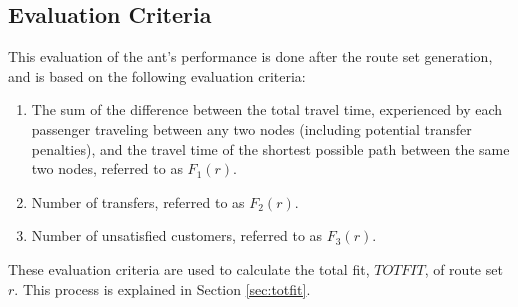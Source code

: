 \subsection{Evaluation Criteria} 
This evaluation of the ant's performance is done after the route set generation, and is based on the following evaluation criteria:
\begin{enumerate}
\item \label{itm:criteriaTotalTravelTime} The sum of the difference between the total travel time, experienced by each passenger traveling between any two nodes (including potential transfer penalties), and the travel time of the shortest possible path between the same two nodes, referred to as $F_1(r)$.
\item \label{itm:f2} Number of transfers, referred to as $F_2(r)$.
\item Number of unsatisfied customers, referred to as $F_3(r)$. 
\end{enumerate}
These evaluation criteria are used to calculate the total fit, $TOTFIT$, of route set $r$. This process is explained in Section \vref{sec:totfit}.



